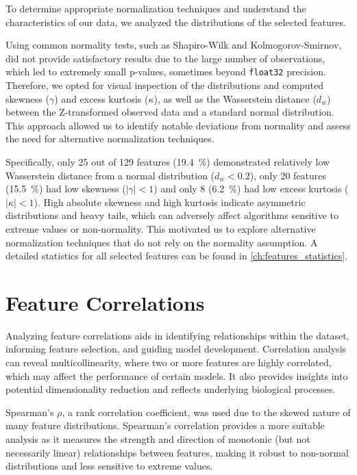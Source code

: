 To determine appropriate normalization techniques and understand the characteristics of our data, we analyzed the distributions of the selected features.

Using common normality tests, such as Shapiro-Wilk and Kolmogorov-Smirnov, did not provide satisfactory results due to the large number of observations, which led to extremely small p-values, sometimes beyond \texttt{float32} precision. Therefore, we opted for visual inspection of the distributions and computed skewness ($\gamma$) and excess kurtosis ($\kappa$), as well as the Wasserstein distance ($d_w$) between the Z-transformed observed data and a standard normal distribution. This approach allowed us to identify notable deviations from normality and assess the need for alternative normalization techniques.

Specifically, only \num{25} out of \num{129} features (\qty{19.4}{\percent}) demonstrated relatively low Wasserstein distance from a normal distribution ($d_w < 0.2$), only \num{20} features (\qty{15.5}{\percent}) had low skewness ($|\gamma| < 1$) and only \num{8} (\qty{6.2}{\percent}) had low excess kurtosis (\(|\kappa| < 1 \)). High absolute skewness and high kurtosis indicate asymmetric distributions and heavy tails, which can adversely affect algorithms sensitive to extreme values or non-normality. This motivated us to explore alternative normalization techniques that do not rely on the normality assumption. A detailed statistics for all selected features can be found in \cref{ch:features_statistics}.


\section{Feature Correlations}

Analyzing feature correlations aids in identifying relationships within the dataset, informing feature selection, and guiding model development. Correlation analysis can reveal multicollinearity, where two or more features are highly correlated, which may affect the performance of certain models. It also provides insights into potential dimensionality reduction and reflects underlying biological processes.

Spearman's \( \rho \), a rank correlation coefficient, was used due to the skewed nature of many feature distributions. Spearman's correlation provides a more suitable analysis as it measures the strength and direction of monotonic (but not necessarily linear) relationships between features, making it robust to non-normal distributions and less sensitive to extreme values.

